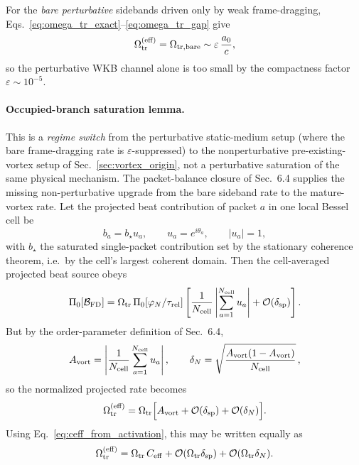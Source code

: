 \documentclass[11pt]{article}
\begin{document}
For the \emph{bare perturbative} sidebands driven only by weak
frame-dragging, Eqs.~\eqref{eq:omega_tr_exact}--\eqref{eq:omega_tr_gap}
give
\begin{equation}
\Omega_{\rm tr}^{\rm (eff)}
= \Omega_{\rm tr,bare}
\sim \varepsilon\,\frac{a_0}{c},
\label{eq:omega_eff_bare}
\end{equation}
so the perturbative WKB channel alone is too small by the compactness
factor $\varepsilon\sim10^{-5}$.

\paragraph{Occupied-branch saturation lemma.}
This is a \emph{regime switch} from the perturbative static-medium setup
(where the bare frame-dragging rate is $\varepsilon$-suppressed) to the
nonperturbative pre-existing-vortex setup of
Sec.~\ref{sec:vortex_origin}, not a perturbative saturation of the same
physical mechanism.
The packet-balance closure of Sec.~6.4 supplies the missing non-perturbative
upgrade from the bare sideband rate to the mature-vortex rate.  Let the
projected beat contribution of packet $a$ in one local Bessel cell be
\[
b_a=b_\star u_a,\qquad u_a=e^{i\theta_a},\qquad |u_a|=1,
\]
with $b_\star$ the saturated single-packet contribution set by the
stationary coherence theorem, i.e.\ by the cell's largest coherent domain.
Then the cell-averaged projected beat source obeys
\begin{equation}
\Pi_0[\mathcal{B}_{\rm FD}]
=
\Omega_{\rm tr}\,\Pi_0[\varphi_N/\tau_{\rm rel}]
\left[
\frac{1}{N_{\rm cell}}\left|\sum_{a=1}^{N_{\rm cell}}u_a\right|
+ \mathcal{O}(\delta_{\rm sp})
\right].
\label{eq:beat_sum_rule}
\end{equation}
But by the order-parameter definition of
Sec.~6.4,
\[
A_{\rm vort}
=
\left|\frac{1}{N_{\rm cell}}\sum_{a=1}^{N_{\rm cell}}u_a\right|,
\qquad
\delta_N=\sqrt{\frac{A_{\rm vort}(1-A_{\rm vort})}{N_{\rm cell}}}\,,
\]
so the normalized projected rate becomes
\begin{equation}
\Omega_{\rm tr}^{\rm (eff)}
=
\Omega_{\rm tr}\Bigl[
A_{\rm vort}
+ \mathcal{O}(\delta_{\rm sp})
+ \mathcal{O}(\delta_N)
\Bigr].
\label{eq:omega_eff_from_activation}
\end{equation}
Using Eq.~\eqref{eq:ceff_from_activation}, this may be written equally as
\begin{equation}
\Omega_{\rm tr}^{\rm (eff)}
=
\Omega_{\rm tr}\,C_{\rm eff}
+ \mathcal{O}(\Omega_{\rm tr}\delta_{\rm sp})
+ \mathcal{O}(\Omega_{\rm tr}\delta_N).
\label{eq:omega_eff_ceff}
\end{equation}
\end{document}

